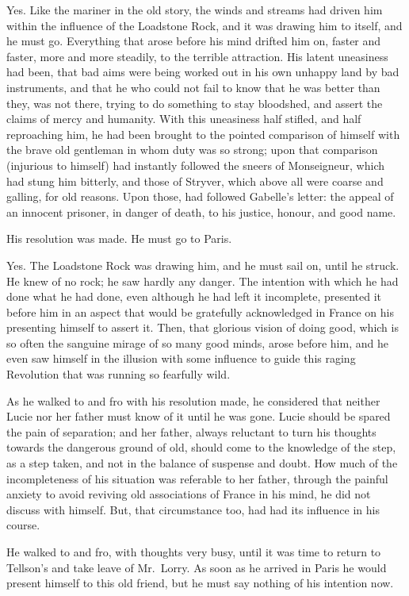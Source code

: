 Yes.  Like the mariner in the old story, the winds and streams had
driven him within the influence of the Loadstone Rock, and it was
drawing him to itself, and he must go.  Everything that arose before
his mind drifted him on, faster and faster, more and more steadily,
to the terrible attraction.  His latent uneasiness had been, that bad
aims were being worked out in his own unhappy land by bad instruments,
and that he who could not fail to know that he was better than they,
was not there, trying to do something to stay bloodshed, and assert
the claims of mercy and humanity.  With this uneasiness half stifled,
and half reproaching him, he had been brought to the pointed comparison
of himself with the brave old gentleman in whom duty was so strong;
upon that comparison (injurious to himself) had instantly followed
the sneers of Monseigneur, which had stung him bitterly, and those of
Stryver, which above all were coarse and galling, for old reasons.
Upon those, had followed Gabelle's letter:  the appeal of an innocent
prisoner, in danger of death, to his justice, honour, and good name.

His resolution was made.  He must go to Paris.

Yes.  The Loadstone Rock was drawing him, and he must sail on, until
he struck.  He knew of no rock; he saw hardly any danger.  The
intention with which he had done what he had done, even although he
had left it incomplete, presented it before him in an aspect that
would be gratefully acknowledged in France on his presenting himself
to assert it.  Then, that glorious vision of doing good, which is so
often the sanguine mirage of so many good minds, arose before him,
and he even saw himself in the illusion with some influence to guide
this raging Revolution that was running so fearfully wild.

As he walked to and fro with his resolution made, he considered that
neither Lucie nor her father must know of it until he was gone.
Lucie should be spared the pain of separation; and her father, always
reluctant to turn his thoughts towards the dangerous ground of old,
should come to the knowledge of the step, as a step taken, and not in
the balance of suspense and doubt.  How much of the incompleteness of
his situation was referable to her father, through the painful
anxiety to avoid reviving old associations of France in his mind, he
did not discuss with himself.  But, that circumstance too,
had had its influence in his course.

He walked to and fro, with thoughts very busy, until it was time to
return to Tellson's and take leave of Mr.\ Lorry.  As soon as he
arrived in Paris he would present himself to this old friend, but he
must say nothing of his intention now.

